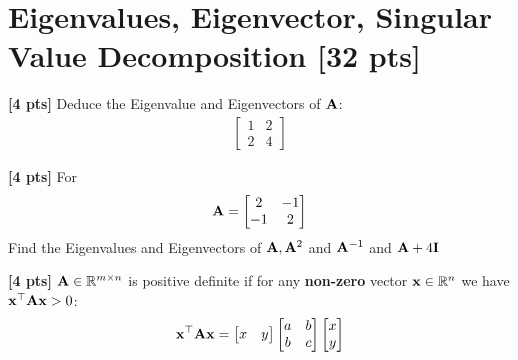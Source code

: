 \documentclass[11pt,addpoints,answers]{exam}
\numberwithin{equation}{section} %
\numberwithin{figure}{section} %
\numberwithin{table}{section} %
\begin{document}
\section{Eigenvalues, Eigenvector, Singular Value Decomposition [32 pts]}
\begin{questions}
    \question \textbf{[4 pts]}  Deduce the Eigenvalue and Eigenvectors of $\mathbf{A}$:
    \begin{align*}
        \begin{bmatrix}
            1 & 2 \\ 2 & 4
        \end{bmatrix}
    \end{align*}
    \begin{tcolorbox}[fit,height=3cm, width=\textwidth, blank, borderline={0.5pt}{-2pt},halign=center, valign=center, nobeforeafter]
    \end{tcolorbox}

    \question \textbf{[4 pts]}   For
    \begin{align*}
         \mathbf{A} = \begin{bmatrix}
             2 & -1 \\ -1 & 2
         \end{bmatrix}
     \end{align*}
     Find the Eigenvalues and Eigenvectors of $\mathbf{A}, \mathbf{A}^2$ and $\mathbf{A}^{-1}$ and $\mathbf{A} + 4\mathbf{I}$

    \begin{tcolorbox}[fit,height=6cm, width=\textwidth, blank, borderline={0.5pt}{-2pt},halign=center, valign=center, nobeforeafter]
    \end{tcolorbox}

    \question \textbf{[4 pts]}  $\mathbf{A} \in \mathbb{R}^{m \times n}$ is positive definite if for any \textbf{non-zero} vector $\mathbf{x} \in \mathbb{R}^{n}$  we have $\mathbf{x}^\top \mathbf{A} \mathbf{x} > 0$:
    \begin{align*}
        \mathbf{x}^\top \mathbf{A} \mathbf{x} = \begin{bmatrix}
            x & y
        \end{bmatrix} \begin{bmatrix}
            a & b \\ b & c
        \end{bmatrix}
        \begin{bmatrix}
            x \\ y
        \end{bmatrix}
    \end{align*}


\end{questions}
\end{document}

